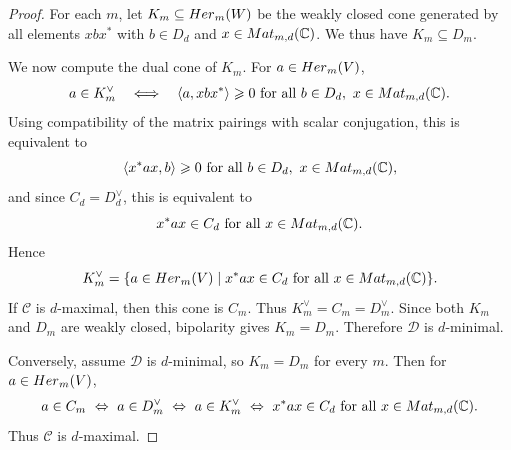 \documentclass[10pt,a4paper]{amsart}
\begin{document}
\begin{proof}
    For each $m$, let $K_m\subseteq {\rm Her}_m(W)$ be the weakly closed cone
    generated by all elements $xbx^*$ with
    $b\in D_d$ and $x\in{\rm Mat}_{m,d}(\mathbb C)$.  We thus have $K_m\subseteq D_m$.

    We now compute the dual cone of $K_m$.  For $a\in{\rm Her}_m(V)$,
    \[
        a\in K_m^\vee
        \quad\Longleftrightarrow\quad
        \langle a,xbx^*\rangle\geqslant 0
        \text{ for all }b\in D_d,
        \ x\in{\rm Mat}_{m,d}(\mathbb C).
    \]
    Using compatibility of the matrix pairings with scalar conjugation, this
    is equivalent to
    \[
        \langle x^*ax,b\rangle\geqslant 0
        \text{ for all }b\in D_d,
        \ x\in{\rm Mat}_{m,d}(\mathbb C),
    \]
    and since $C_d=D_d^\vee$, this is equivalent to
    \[
        x^*ax\in C_d
        \text{ for all }x\in{\rm Mat}_{m,d}(\mathbb C).
    \]
    Hence
    \[
        K_m^\vee
        =\{a\in{\rm Her}_m(V)\mid x^*ax\in C_d
        \text{ for all }x\in{\rm Mat}_{m,d}(\mathbb C)\}.
    \]
    If $\mathcal C$ is $d$-maximal, then this cone is $C_m$.  Thus
    $K_m^\vee=C_m=D_m^\vee$.  Since both $K_m$ and $D_m$ are weakly closed,
    bipolarity gives $K_m=D_m$.  Therefore $\mathcal D$ is $d$-minimal.

    Conversely, assume $\mathcal D$ is $d$-minimal, so $K_m=D_m$ for every
    $m$.  Then for $a\in{\rm Her}_m(V)$,
    \[
        a\in C_m
        \ \Leftrightarrow\
        a\in D_m^\vee
        \ \Leftrightarrow\
        a\in K_m^\vee
        \ \Leftrightarrow\
        x^*ax\in C_d
        \text{ for all }x\in{\rm Mat}_{m,d}(\mathbb C).
    \]
    Thus $\mathcal C$ is $d$-maximal.
\end{proof}
\end{document}
